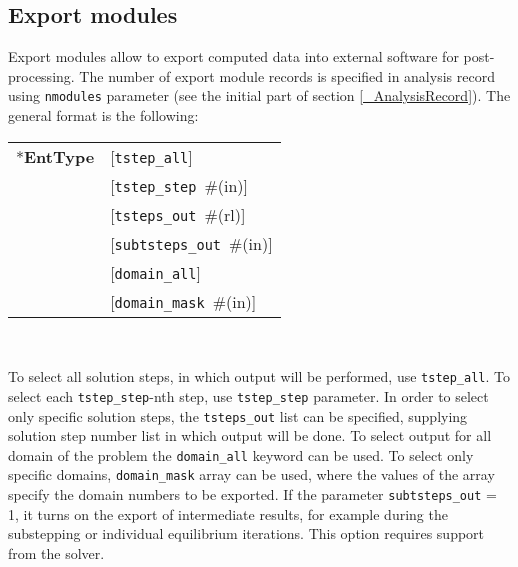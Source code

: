 \documentclass[a4paper]{article}
\makeatletter
\newcommand{\param}[1]{\texttt{#1}} %
\newcommand{\optional}[1]{[#1]} %
\newcommand{\field}[2]{\param{#1}~\#{\tiny(#2)}} %
\newcommand{\optField}[2]{\optional{\field{#1}{#2}}}
\newcommand{\fieldnotype}[1]{\param{#1}}
\newcommand{\entKeyword}[1]{*\textbf{#1}} %
\newenvironment{record}[1][]{\begin{tabular}{|ll}}{\end{tabular}\\}
\newcommand{\recentry}[2]{{#1}&{#2}\\}
\newcounter{rcc}
\newenvironment{record}[1][\textwidth]{\setcounter{rcc}{0}\begin{tabular*}{#1}{|ll@{\extracolsep{\fill}}r}}{\end{tabular*}\\}
\newcommand{\recentry}[2]{\ifthenelse{\value{rcc}>0}{&$\backslash$ \\}{\setcounter{rcc}{1}}{#1}&{#2}}
\makeatother
\begin{document}
\subsection{Export modules}
\label{ExportModulesSec}
Export modules allow to export computed data into external software for
post-processing. The number of export module records is specified in
analysis record using \param{nmodules} parameter (see the initial part of section \ref{_AnalysisRecord}). The general format
is the following:\\
\begin{record}
  \recentry{\entKeyword{EntType}}{[\fieldnotype{tstep\_all}]}
  \recentry{}{\optField{tstep\_step}{in}}
  \recentry{}{\optField{tsteps\_out}{rl}}
  \recentry{}{\optField{subtsteps\_out}{in}}
  \recentry{}{[\fieldnotype{domain\_all}]}
  \recentry{}{\optField{domain\_mask}{in}}
\end{record}

To select all solution steps, in which output will be performed, use
\param{tstep\_all}. To select each \param{tstep\_step}-nth step, use
\param{tstep\_step} parameter. In order to select only specific
solution steps, the \param{tsteps\_out} list can be specified,
supplying solution step number list in which output will be done.
To select output for all domain of the problem the \param{domain\_all}
keyword can be used. To select only specific domains,
\param{domain\_mask} array can be used, where the values of the array
specify the domain numbers to be exported.
If the parameter \param{subtsteps\_out} = 1, it turns on the export of intermediate results, 
for example during the substepping or individual equilibrium iterations. This option requires support from the solver.
\end{document}
